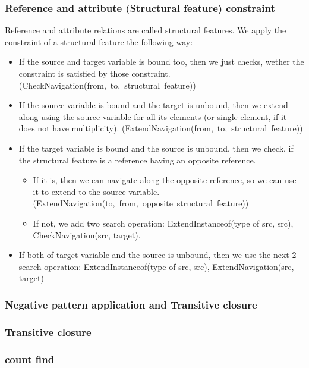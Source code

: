 \subsubsection{Reference and attribute (Structural feature) constraint}

Reference and attribute relations are called structural features.
We apply the constraint of a structural feature the following way:
\begin{itemize}
	\item If the source and target variable is bound too, then we just checks, wether the constraint is satisfied by those constraint. \mbox{(CheckNavigation(from, to, structural feature))}
	\item If the source variable is bound and the target is unbound, then we extend along using the source variable for all its elements (or single element, if it does not have multiplicity). \mbox{(ExtendNavigation(from, to, structural feature))}
	\item If the target variable is bound and the source is unbound, then we check, if the structural feature is a reference having an opposite reference. 
	\begin{itemize}
		\item If it is, then we can navigate along the opposite reference, so we can use it to extend to the source variable. \mbox{(ExtendNavigation(to, from, opposite structural feature))}
		\item If not, we add two search operation: ExtendInstanceof(type of src, src), CheckNavigation(src, target). 
	\end{itemize}

	\item If both of  target variable and the source is unbound, then we use the next 2 search operation: ExtendInstanceof(type of src, src), ExtendNavigation(src, target)

\end{itemize}


\subsubsection{Negative pattern application and Transitive closure}


\subsubsection{Transitive closure}


\subsubsection{count find}


